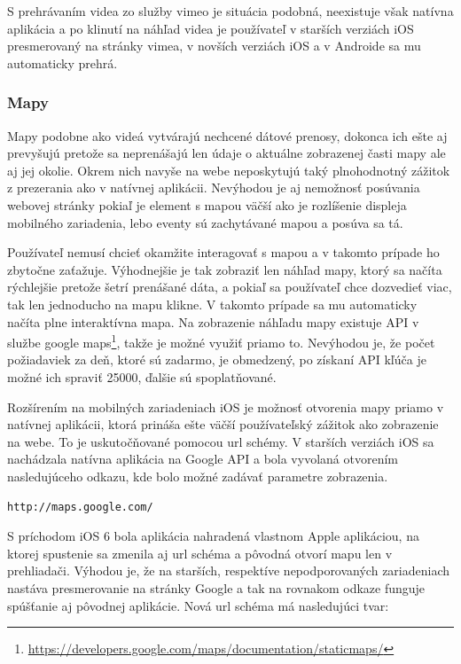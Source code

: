 S prehrávaním videa zo služby vimeo je situácia podobná, neexistuje však natívna aplikácia a po klinutí na náhľad videa je používateľ v starších verziách iOS presmerovaný na stránky vimea, v novších verziách iOS a v Androide sa mu automaticky prehrá.



\subsubsection{Mapy} %
\label{subsub:mapy}

Mapy podobne ako videá vytvárajú nechcené dátové prenosy, dokonca ich ešte aj prevyšujú pretože sa neprenášajú len údaje o aktuálne zobrazenej časti mapy ale aj jej okolie. Okrem nich navyše na webe neposkytujú taký plnohodnotný zážitok z prezerania ako v natívnej aplikácii. Nevýhodou je aj nemožnosť posúvania webovej stránky pokiaľ je element s mapou väčší ako je rozlíšenie displeja mobilného zariadenia, lebo eventy sú zachytávané mapou a posúva sa tá.

Používateľ nemusí chcieť okamžite interagovať s mapou a v takomto prípade ho zbytočne zaťažuje. Výhodnejšie je tak zobraziť len náhľad mapy, ktorý sa načíta rýchlejšie pretože šetrí prenášané dáta, a pokiaľ sa používateľ chce dozvedieť viac, tak len jednoducho na mapu klikne. V takomto prípade sa mu automaticky načíta plne interaktívna mapa. Na zobrazenie náhľadu mapy existuje API v službe google maps\footnote{\url{https://developers.google.com/maps/documentation/staticmaps/}}, takže je možné využiť priamo to. Nevýhodou je, že počet požiadaviek za deň, ktoré sú zadarmo, je obmedzený, po získaní API kľúča je možné ich spraviť 25000, ďalšie sú spoplatňované.

Rozšírením na mobilných zariadeniach iOS je možnosť otvorenia mapy priamo v natívnej aplikácii, ktorá prináša ešte väčší používateľský zážitok ako zobrazenie na webe. To je uskutočňované pomocou url schémy. V starších verziách iOS sa nachádzala natívna aplikácia na Google API a bola vyvolaná otvorením nasledujúceho odkazu, kde bolo možné zadávať parametre zobrazenia.

\begin{verbatim}
http://maps.google.com/
\end{verbatim}

S príchodom iOS 6 bola aplikácia nahradená vlastnom Apple aplikáciou, na ktorej spustenie sa zmenila aj url schéma a pôvodná otvorí mapu len v prehliadači. Výhodou je, že na starších, respektíve nepodporovaných zariadeniach nastáva presmerovanie na stránky Google a tak na rovnakom odkaze funguje spúšťanie aj pôvodnej aplikácie. Nová url schéma má nasledujúci tvar:

